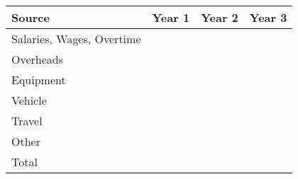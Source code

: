 \documentclass[version=last,
    paper=a4,                               %
    10pt,                                   %
    dvipsnames,
    oneside,                              %
    headings=openany,                       %
    open=any,
    BCOR=7mm,                               %
    DIV=15,     %
]{scrbook}
\begin{document}
\begin{longtabu} to \linewidth { |  X | X | X | X | }
\hline
{}
Source & Year 1 & Year 2 & Year 3\\
\hline
\endhead



Salaries, Wages, Overtime &  &  & \\



Overheads &  &  & \\



Equipment &  &  & \\



Vehicle &  &  & \\



Travel &  &  & \\



Other &  &  & \\



Total &  &  & \\


\hline
\end{longtabu}





\end{document}
